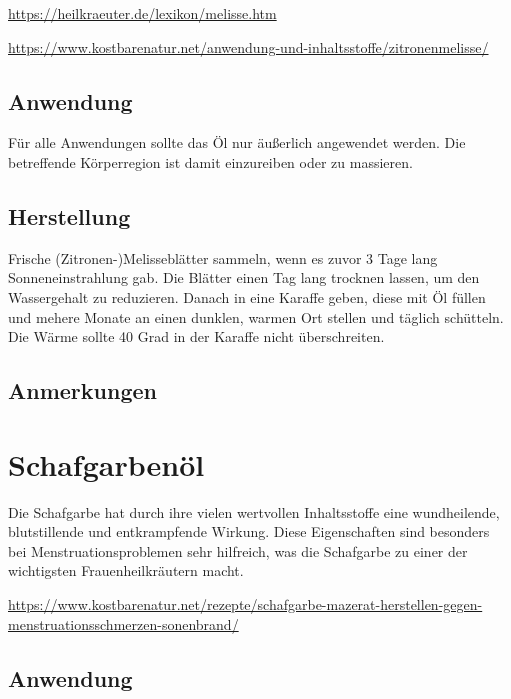\cite{heilkraeuterlexikon} 

\url{https://heilkraeuter.de/lexikon/melisse.htm} 

\url{https://www.kostbarenatur.net/anwendung-und-inhaltsstoffe/zitronenmelisse/}

 

\subsection{Anwendung}

Für alle Anwendungen sollte das Öl nur äußerlich angewendet werden. Die betreffende Körperregion ist damit einzureiben oder zu massieren.

\subsection{Herstellung}

Frische (Zitronen-)Melisseblätter sammeln, wenn es zuvor 3 Tage lang Sonneneinstrahlung gab. Die Blätter einen Tag lang trocknen lassen, um den Wassergehalt zu reduzieren. Danach in eine Karaffe geben, diese mit Öl füllen und mehere Monate an einen dunklen, warmen Ort stellen und täglich schütteln. Die Wärme sollte 40 Grad in der Karaffe nicht überschreiten.

\subsection{Anmerkungen}







\section{Schafgarbenöl}

Die Schafgarbe hat durch ihre vielen wertvollen Inhaltsstoffe eine wundheilende, blutstillende und entkrampfende Wirkung. Diese Eigenschaften sind besonders bei Menstruationsproblemen sehr hilfreich, was die Schafgarbe zu einer der wichtigsten Frauenheilkräutern macht.


\url{https://www.kostbarenatur.net/rezepte/schafgarbe-mazerat-herstellen-gegen-menstruationsschmerzen-sonenbrand/}

   


\subsection{Anwendung}

